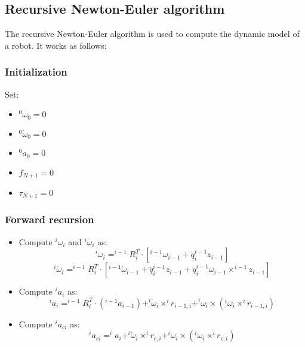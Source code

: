 \documentclass[a4paper,12pt]{article}
\begin{document}
\subsection{Recursive Newton-Euler algorithm}
The recursive Newton-Euler algorithm is used to compute the 
dynamic model of a robot. It works as follows:
\subsubsection{Initialization}
Set:
\begin{itemize}
    \item $^0\omega_0 = 0$
    \item $^0\dot{\omega}_0=0$
    \item $^0a_0 = 0$
    \item $f_{N+1} = 0$
    \item $\tau_{N+1} = 0$
\end{itemize}
\subsubsection{Forward recursion}
\begin{itemize}
    \item Compute $^i\omega_i$ and $^i\dot{\omega}_i$ as: \begin{equation}
        ^i\omega_i = ^{i-1}R_i^T \cdot[ ^{i-1}\omega_{i-1} + \dot{q}_i ^{i-1}z_{i-1}]
    \end{equation} \begin{equation}
        ^i\dot{\omega}_i = ^{i-1}R_i^T \cdot[ ^{i-1}\dot{\omega}_{i-1} + \ddot{q}_i ^{i-1}z_{i-1}  + \dot{q}_i ^{i-1}\omega_{i-1} \times ^{i-1}z_{i-1}]
    \end{equation}
    \item Compute $^i a_i$ as: \begin{equation}
        ^i a_i = ^{i-1}R_i^T \cdot (^{i-1}a_{i-1}) + ^{i}\dot{\omega}_{i} \times ^{i}r_{i-1,i} + ^{i}\omega_{i} \times (^{i}\omega_{i} \times ^{i}r_{i-1,i})
    \end{equation}
    \item Compute $^i a_{ci}$ as: \begin{equation}
        ^i a_{ci} = ^i a_i + ^i\dot{\omega}_i \times ^i r_{c,i} + ^i\omega_i \times (^i\omega_i \times ^i r_{c,i})
    \end{equation}
\end{itemize}
\end{document}
